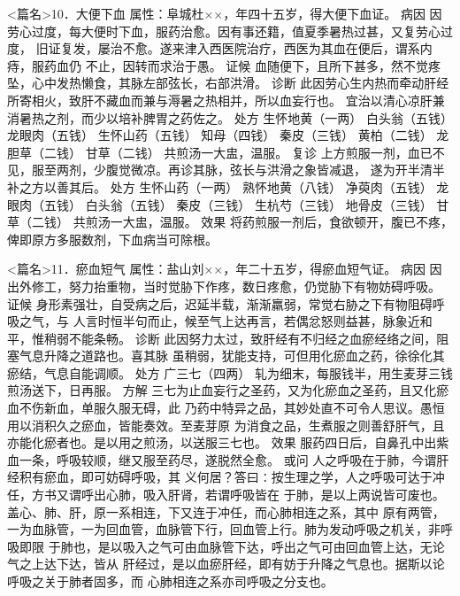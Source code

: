 \documentclass[a4paper,12pt,UTF8,twoside]{ctexbook}
\begin{document}
<篇名>10．大便下血
属性：阜城杜××，年四十五岁，得大便下血证。 
病因 因劳心过度，每大便时下血，服药治愈。因有事还籍，值夏季暑热过甚，又复劳心过度， 
旧证复发，屡治不愈。遂来津入西医院治疗，西医为其血在便后，谓系内痔，服药血仍 
不止，因转而求治于愚。 
证候 血随便下，且所下甚多，然不觉疼坠，心中发热懒食，其脉左部弦长，右部洪滑。 
诊断 此因劳心生内热而牵动肝经所寄相火，致肝不藏血而兼与溽暑之热相并，所以血妄行也。 
宜治以清心凉肝兼消暑热之剂，而少以培补脾胃之药佐之。 
处方 生怀地黄（一两） 白头翁（五钱） 龙眼肉（五钱） 生怀山药（五钱） 
知母（四钱） 秦皮（三钱） 黄柏（二钱） 龙胆草（二钱） 甘草（二钱） 
共煎汤一大盅，温服。 
复诊 上方煎服一剂，血已不见，服至两剂，少腹觉微凉。再诊其脉，弦长与洪滑之象皆减退， 
遂为开半清半补之方以善其后。 
处方 生怀山药（一两） 熟怀地黄（八钱） 净萸肉（五钱） 龙眼肉（五钱） 
白头翁（五钱） 秦皮（三钱） 生杭芍（三钱） 地骨皮（三钱） 
甘草（二钱） 
共煎汤一大盅，温服。 
效果 将药煎服一剂后，食欲顿开，腹已不疼，俾即原方多服数剂，下血病当可除根。 


<篇名>11．瘀血短气
属性：盐山刘××，年二十五岁，得瘀血短气证。 
病因 因出外修工，努力抬重物，当时觉胁下作疼，数日疼愈，仍觉胁下有物妨碍呼吸。 
证候 身形素强壮，自受病之后，迟延半载，渐渐羸弱，常觉右胁之下有物阻碍呼吸之气，与 
人言时恒半句而止，候至气上达再言，若偶忿怒则益甚，脉象近和平，惟稍弱不能条畅。 
诊断 此因努力太过，致肝经有不归经之血瘀经络之间，阻塞气息升降之道路也。喜其脉 
虽稍弱，犹能支持，可但用化瘀血之药，徐徐化其瘀结，气息自能调顺。 
处方 广三七（四两） 
轧为细末，每服钱半，用生麦芽三钱煎汤送下，日再服。 
方解 三七为止血妄行之圣药，又为化瘀血之圣药，且又化瘀血不伤新血，单服久服无碍，此 
乃药中特异之品，其妙处直不可令人思议。愚恒用以消积久之瘀血，皆能奏效。至麦芽原 
为消食之品，生煮服之则善舒肝气，且亦能化瘀者也。是以用之煎汤，以送服三七也。 
效果 服药四日后，自鼻孔中出紫血一条，呼吸较顺，继又服至药尽，遂脱然全愈。 
或问 人之呼吸在于肺，今谓肝经积有瘀血，即可妨碍呼吸，其 
义何居？答曰∶按生理之学，人之呼吸可达于冲任，方书又谓呼出心肺，吸入肝肾，若谓呼吸皆在 
于肺，是以上两说皆可废也。盖心、肺、肝，原一系相连，下又连于冲任，而心肺相连之系，其中 
原有两管，一为血脉管，一为回血管，血脉管下行，回血管上行。肺为发动呼吸之机关，非呼吸即限 
于肺也，是以吸入之气可由血脉管下达，呼出之气可由回血管上达，无论气之上达下达，皆从 
肝经过，是以血瘀肝经，即有妨于升降之气息也。据斯以论呼吸之关于肺者固多，而 
心肺相连之系亦司呼吸之分支也。 
\end{document}
